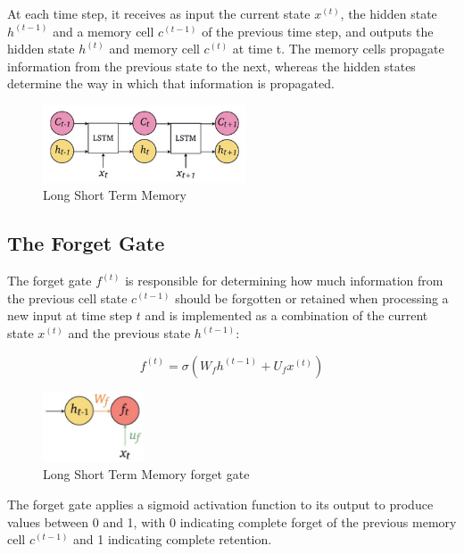 \noindent At each time step, it receives as input the current state $x^{(t)}$, the hidden state $h^{(t-1)}$ and a memory cell $c^{(t-1)}$ of the previous time step, and outputs the hidden state $h^{(t)}$ and memory cell $c^{(t)}$ at time t. The memory cells propagate information from the previous state to the next, whereas the hidden states determine the way in which that information is propagated. 

\begin{figure}[h]
    \centering
    \includegraphics[width=6cm]{Images/lstm-sequential.png}
    \caption{Long Short Term Memory}
    \label{fig:lstm-seq}
\end{figure}

\subsection{The Forget Gate}

The forget gate $f^{(t)}$ is responsible for determining how much information from the previous cell state $c^{(t-1)}$ should be forgotten or retained when processing a new input at time step $t$ and is implemented as a combination of the current state $x^{(t)}$ and the previous state $h^{(t-1)}$:

$$ f^{(t)} = \sigma \left( W_f h^{(t-1)} + U_f x^{(t)}   \right) $$

\begin{figure}[h]
    \centering
    \includegraphics[width=3cm]{Images/lstm-forget-gate.png}
    \caption{Long Short Term Memory forget gate}
    \label{fig:lstm-forget-gate}
\end{figure}

\noindent The forget gate applies a sigmoid activation function to its output to produce values between 0 and 1, with 0 indicating complete forget of the previous memory cell $c^{(t-1)}$ and 1 indicating complete retention.



